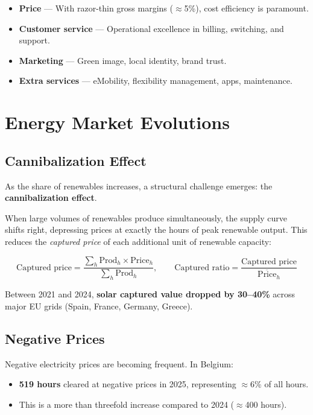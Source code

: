 \begin{itemize}[noitemsep]
    \item \textbf{Price} — With razor-thin gross margins ($\approx$5\%), cost efficiency is paramount.
    \item \textbf{Customer service} — Operational excellence in billing, switching, and support.
    \item \textbf{Marketing} — Green image, local identity, brand trust.
    \item \textbf{Extra services} — eMobility, flexibility management, apps, maintenance.
\end{itemize}

\section{Energy Market Evolutions}

\subsection*{Cannibalization Effect}

As the share of renewables increases, a structural challenge emerges: the \textbf{cannibalization effect}.

When large volumes of renewables produce simultaneously, the supply curve shifts right, depressing prices at exactly the hours of peak renewable output. This reduces the \textit{captured price} of each additional unit of renewable capacity:

\[
\text{Captured price} = \frac{\sum_h \text{Prod}_h \times \text{Price}_h}{\sum_h \text{Prod}_h}, \qquad
\text{Captured ratio} = \frac{\text{Captured price}}{\overline{\text{Price}}_h}
\]

\noindent Between 2021 and 2024, \textbf{solar captured value dropped by 30–40\%} across major EU grids (Spain, France, Germany, Greece).

\subsection*{Negative Prices}

Negative electricity prices are becoming frequent. In Belgium:
\begin{itemize}[noitemsep]
    \item \textbf{519 hours} cleared at negative prices in 2025, representing $\approx$6\% of all hours.
    \item This is a more than threefold increase compared to 2024 ($\approx$400 hours).
\end{itemize}

